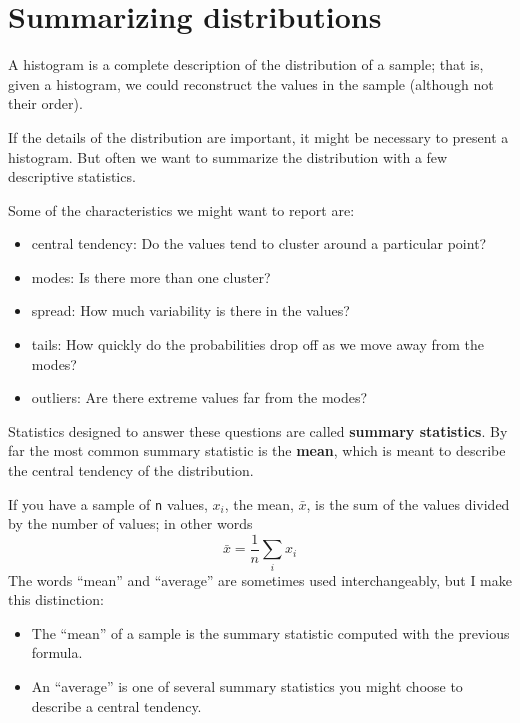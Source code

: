 \documentclass[12pt]{book}
\newcommand{\xbar}{\bar{x}}
\theoremstyle{exercise}
\begin{document}
\section{Summarizing distributions}%
\label{mean}

A histogram is a complete description of the distribution of a sample;
that is, given a histogram, we could reconstruct the values in the
sample (although not their order).

If the details of the distribution are important, it might be
necessary to present a histogram.  But often we want to
summarize the distribution with a few descriptive statistics.

Some of the characteristics we might want to report are:

\begin{itemize}

\item central tendency: Do the values tend to cluster around
a particular point?%

\item modes: Is there more than one cluster?%

\item spread: How much variability is there in the values?%

\item tails: How quickly do the probabilities drop off as we
move away from the modes?%

\item outliers: Are there extreme values far from the modes?%

\end{itemize}

Statistics designed to answer these questions are called {\bf summary
  statistics}.  By far the most common summary statistic is the {\bf
  mean}, which is meant to describe the central tendency of the
distribution.%
%
%

If you have a sample of {\tt n} values, $x_i$, the mean, $\xbar$, is
the sum of the values divided by the number of values; in other words
%
\[ \xbar = \frac{1}{n} \sum_i x_i \]
%
The words ``mean'' and ``average'' are sometimes used interchangeably,
but I make this distinction:

\begin{itemize}

\item The ``mean'' of a sample is the summary statistic computed with
  the previous formula.

\item An ``average'' is one of several summary statistics you might
  choose to describe a central tendency.%

\end{itemize}
\end{document}
